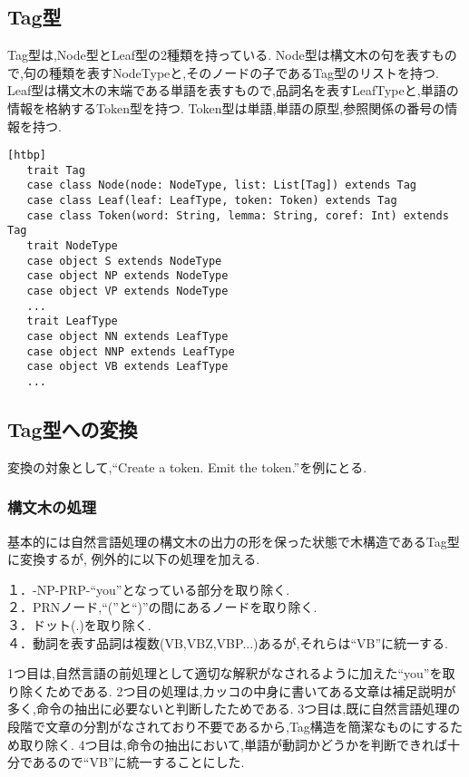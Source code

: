 \documentclass[uplatex,a4j]{jsreport}
\begin{document}
\subsection{Tag型}
Tag型は,Node型とLeaf型の2種類を持っている.
Node型は構文木の句を表すもので,句の種類を表すNodeTypeと,そのノードの子であるTag型のリストを持つ.
Leaf型は構文木の末端である単語を表すもので,品詞名を表すLeafTypeと,単語の情報を格納するToken型を持つ.
Token型は単語,単語の原型,参照関係の番号の情報を持つ.\\
\begin{lstlisting}[basicstyle=\ttfamily\footnotesize, frame=single, caption=Tagの定義,label=Tag][htbp]
   trait Tag
   case class Node(node: NodeType, list: List[Tag]) extends Tag
   case class Leaf(leaf: LeafType, token: Token) extends Tag
   case class Token(word: String, lemma: String, coref: Int) extends Tag
   trait NodeType
   case object S extends NodeType
   case object NP extends NodeType
   case object VP extends NodeType
   ...
   trait LeafType
   case object NN extends LeafType
   case object NNP extends LeafType
   case object VB extends LeafType
   ...
\end{lstlisting}
\subsection{Tag型への変換}
変換の対象として,``Create a token. Emit the token.''を例にとる.
\subsubsection{構文木の処理}
\label{構文木の処理}
基本的には自然言語処理の構文木の出力の形を保った状態で木構造であるTag型に変換するが,
例外的に以下の処理を加える.\\%
\begin{screen}
１．-NP-PRP-``you''となっている部分を取り除く.\\
２．PRNノード,``(''と``)''の間にあるノードを取り除く.\\
３．ドット(.)を取り除く.\\
４．動詞を表す品詞は複数(VB,VBZ,VBP...)あるが,それらは``VB''に統一する.
\end{screen}
1つ目は,自然言語の前処理として適切な解釈がなされるように加えた``you''を取り除くためである.
2つ目の処理は,カッコの中身に書いてある文章は補足説明が多く,命令の抽出に必要ないと判断したためである.
3つ目は,既に自然言語処理の段階で文章の分割がなされており不要であるから,Tag構造を簡潔なものにするため取り除く.
4つ目は,命令の抽出において,単語が動詞かどうかを判断できれば十分であるので``VB''に統一することにした.\\
\end{document}
